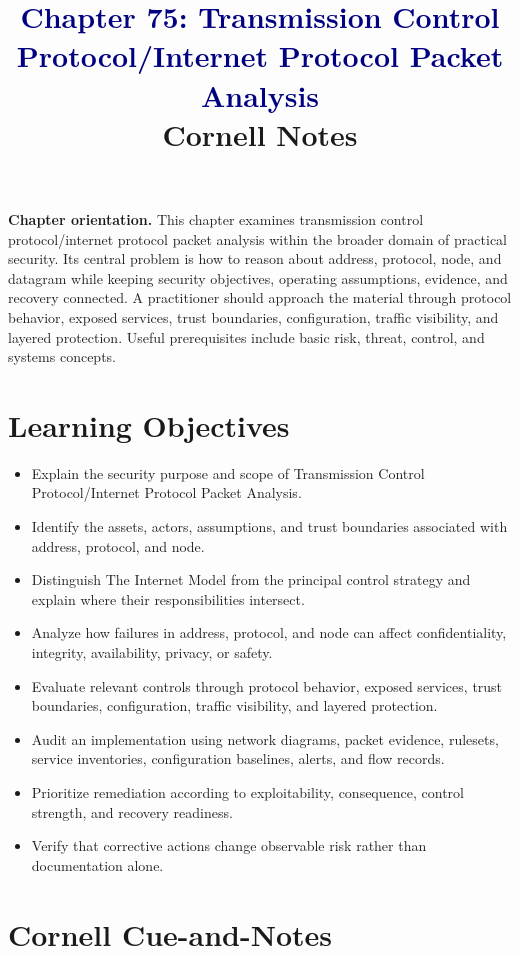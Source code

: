 \documentclass[11pt]{article}
\title{\textcolor{Navy}{Chapter 75: Transmission Control Protocol/Internet Protocol Packet Analysis}\\[2mm]\large Cornell Notes}
\author{}
\date{}
\begin{document}
\maketitle
\thispagestyle{fancy}
\vspace{-1.5em}
\begin{orientationbox}
\textbf{Chapter orientation.} This chapter examines transmission control protocol/internet protocol packet analysis within the broader domain of practical security. Its central problem is how to reason about address, protocol, node, and datagram while keeping security objectives, operating assumptions, evidence, and recovery connected. A practitioner should approach the material through protocol behavior, exposed services, trust boundaries, configuration, traffic visibility, and layered protection. Useful prerequisites include basic risk, threat, control, and systems concepts.
\end{orientationbox}
\section*{Learning Objectives}
\begin{itemize}
\item Explain the security purpose and scope of Transmission Control Protocol/Internet Protocol Packet Analysis.
\item Identify the assets, actors, assumptions, and trust boundaries associated with address, protocol, and node.
\item Distinguish The Internet Model from the principal control strategy and explain where their responsibilities intersect.
\item Analyze how failures in address, protocol, and node can affect confidentiality, integrity, availability, privacy, or safety.
\item Evaluate relevant controls through protocol behavior, exposed services, trust boundaries, configuration, traffic visibility, and layered protection.
\item Audit an implementation using network diagrams, packet evidence, rulesets, service inventories, configuration baselines, alerts, and flow records.
\item Prioritize remediation according to exploitability, consequence, control strength, and recovery readiness.
\item Verify that corrective actions change observable risk rather than documentation alone.
\end{itemize}
\section*{Cornell Cue-and-Notes}
\end{document}
